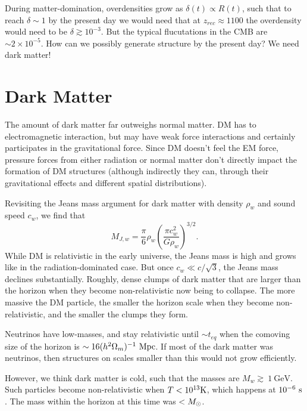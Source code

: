 \documentclass[]{article}
\begin{document}
During matter-domination, overdensities grow as $\delta(t)\propto R(t)$, such
that to reach $\delta\sim1$ by the present day we would need that at $z_{rec}\approx1100$
the overdensity would need to be $\delta\gtrsim10^{-3}$.  But the typical
flucutations in the CMB are $\sim 2\times 10^{-5}$.  How can we possibly generate
structure by the present day?  We need dark matter!

\section{Dark Matter}
The amount of dark matter far outweighs normal matter. 
DM has to electromagnetic interaction, but may have weak
force interactions and certainly participates in the 
gravitational force. Since DM doesn't feel the EM force,
pressure forces from either radiation or normal matter
don't directly impact the formation of DM structures
(although indirectly they can, through their gravitational
effects and different spatial distributions).

Revisiting the Jeans mass argument for dark matter with
density $\rho_w$ and sound speed $c_w$, we find that
\begin{equation}
M_{J,w} = \frac{\pi}{6} \rho_w \left(\frac{\pi c_w^2}{G\rho_w}\right)^{3/2}.
\end{equation}
\noindent
While DM is relativistic in the early universe, the Jeans
mass is high and grows like in the radiation-dominated case.
But once $c_w\ll c/\sqrt{3}$, the Jeans mass declines substantially.
Roughly, dense clumps of dark matter that are larger than the
horizon when they become non-relativistic now being to collapse.
The more massive the DM particle, the smaller the horizon scale
when they become non-relativistic, and the smaller the clumps they
form.

Neutrinos have low-masses, and stay relativistic until $\sim t_{eq}$
when the comoving size of the horizon is $\sim 16 (h^2 \Omega_m)^{-1}~\mathrm{Mpc}$.
If most of the dark matter was neutrinos, then structures on scales
smaller than this would not grow efficiently.

However, we think dark matter is cold, such that the masses are $M_w\gtrsim~1~\mathrm{GeV}$.
Such particles become non-relativistic when $T<10^{13}\mathrm{K}$, which happens
at $10^{-6}~\mathrm{s}$.  The mass within the horizon at this time was $<M_{\odot}$.
\end{document}
